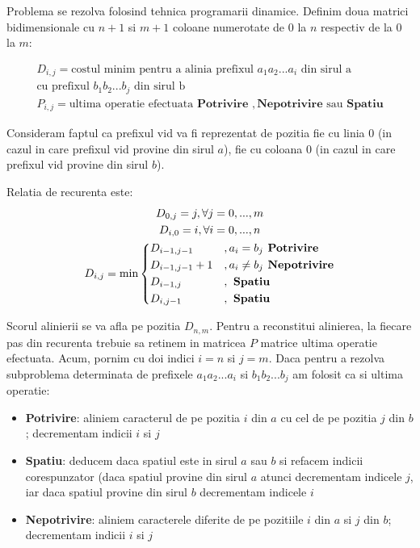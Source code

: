 Problema se rezolva folosind tehnica programarii dinamice. Definim
doua matrici bidimensionale cu $n+1$ si $m+1$ coloane numerotate de $0$ la $n$ respectiv de la $0$
la $m$:

\begin{gather*}
  D_{i,j} = \text{costul minim pentru a alinia prefixul } a_1a_2...a_i \text{ din sirul a} \\
  \text{cu prefixul } b_1b_2...b_j \text{ din sirul b} \\
  P_{i,j} = \text{ultima operatie efectuata } \textbf{Potrivire }, \textbf{Nepotrivire } \text{sau} 
  \textbf{ Spatiu}
\end{gather*}

Consideram faptul ca prefixul vid va fi reprezentat de pozitia fie cu linia $0$ (in cazul in care
prefixul vid provine din sirul $a$), fie cu coloana $0$ (in cazul in care prefixul vid provine
din sirul $b$).

Relatia de recurenta este:
\begin{gather*}
  D_{0,j} = j, \forall j=0,...,m \\
  D_{i,0} = i, \forall i=0,...,n \\
  D_{i,j} = \min \begin{dcases}
      D_{i-1,j-1}       &, a_i=b_j \textbf{ Potrivire} \\
      D_{i-1,j-1}+1     &, a_i \neq b_j \textbf{ Nepotrivire} \\
      D_{i-1,j}         &, \textbf{ Spatiu} \\
      D_{i,j-1}         &, \textbf{ Spatiu} \\
    \end{dcases}
\end{gather*}

Scorul alinierii se va afla pe pozitia $D_{n,m}$. Pentru a reconstitui alinierea, la fiecare pas din 
recurenta trebuie sa retinem in matricea $P$ matrice ultima operatie efectuata. Acum, pornim cu doi
indici $i = n$ si $j = m$. Daca pentru a rezolva subproblema determinata de prefixele $a_1a_2...a_i$
si $b_1b_2...b_j$ am folosit ca si ultima operatie:

\begin{itemize}
  \item \textbf{Potrivire}: aliniem caracterul de pe pozitia $i$ din $a$ cu cel de pe pozitia $j$ 
    din $b$; decrementam indicii $i$ si $j$  
  \item \textbf{Spatiu}: deducem daca spatiul este in sirul $a$ sau $b$ si refacem indicii corespunzator
    (daca spatiul provine din sirul $a$ atunci decrementam indicele $j$, iar daca spatiul provine
    din sirul $b$ decrementam indicele $i$
  \item \textbf{Nepotrivire}: aliniem caracterele diferite de pe pozitiile $i$ din $a$ si $j$ din $b$;
    decrementam indicii $i$ si $j$
\end{itemize}

